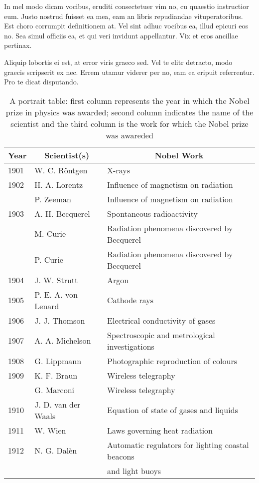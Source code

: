 In mel modo dicam vocibus, eruditi consectetuer vim no, cu quaestio 
instructior eum. Justo nostrud fuisset ea mea, eam an libris repudiandae 
vituperatoribus. Est choro corrumpit definitionem at. Vel sint adhuc vocibus 
ea, illud epicuri eos no. Sea simul officiis ea, et qui veri invidunt 
appellantur. Vix et eros ancillae pertinax.

Aliquip lobortis ei est, at error viris graeco sed. Vel te elitr detracto, 
modo graecis scripserit ex nec. Errem utamur viderer per no, eam ea eripuit 
referrentur. Pro te dicat disputando. 

\vspace{0.25in}
\begin{table}[hbt]
  \caption{A portrait table:
    first column represents the year in which the Nobel prize in
    physics was awarded; second column indicates the name of the
    scientist and the third column is the work for which the Nobel
    prize was awareded}
  \begin{center}
    \begin{tabular}{lll}
      \hline
      \multicolumn{1}{c}{\textbf{Year}} & 
      \multicolumn{1}{c}{\textbf{Scientist(s)}} &
      \multicolumn{1}{c}{\textbf{Nobel Work}}\\
      \hline
      1901 & W. C. R\"{o}ntgen & X-rays\\
      1902 & H. A. Lorentz & Influence of magnetism on radiation\\
           & P. Zeeman     & Influence of magnetism on radiation\\
      1903 & A. H. Becquerel & Spontaneous radioactivity\\
           & M. Curie        & Radiation phenomena discovered by Becquerel\\
           & P. Curie        & Radiation phenomena discovered by Becquerel\\
      1904 & J. W. Strutt & Argon\\
      1905 & P. E. A. von Lenard & Cathode rays\\
      1906 & J. J. Thomson & Electrical conductivity of gases\\
      1907 & A. A. Michelson & Spectroscopic and metrological investigations\\
      1908 & G. Lippmann & Photographic reproduction of colours\\
      1909 & K. F. Braun & Wireless telegraphy\\
           & G. Marconi &  Wireless telegraphy\\
      1910 & J. D. van der Waals & Equation of state of gases and liquids\\
      1911 & W. Wien & Laws governing heat radiation\\
      1912 & N. G. Dal\`{e}n & Automatic regulators for lighting coastal beacons\\
           &                 & and light buoys\\
      \hline
    \end{tabular}
    \label{CHAPTER2_TABLE01}
  \end{center}
\end{table}

